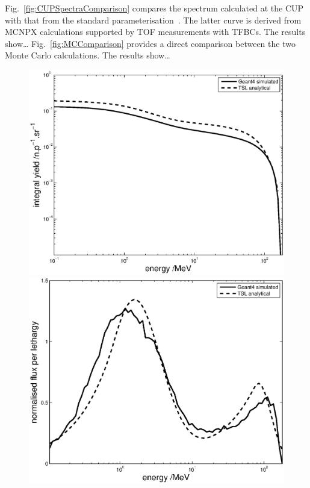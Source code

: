 \documentclass[11pt,a4paper]{IEEEtran}
\begin{document}
Fig.~\ref{fig:CUPSpectraComparison} compares the spectrum calculated at the CUP with that from the standard parameterisation~\cite{Prokofiev14}.
The latter curve is derived from MCNPX calculations supported by TOF measurements with TFBCs.
The results show\ldots
{}
Fig.~\ref{fig:MCComparison} provides a direct comparison between the two Monte Carlo calculations.
The results show\ldots
{}

\begin{figure}[t]
    \begin{minipage}{\columnwidth}
        \includegraphics[width=\columnwidth]{ANITAIntYieldRADECS.eps}
    \end{minipage}
    \begin{minipage}{\columnwidth}
        \includegraphics[width=\columnwidth]{ANITALetYieldnormalisedRADECS.eps}

\end{minipage}
\end{figure}
\end{document}
